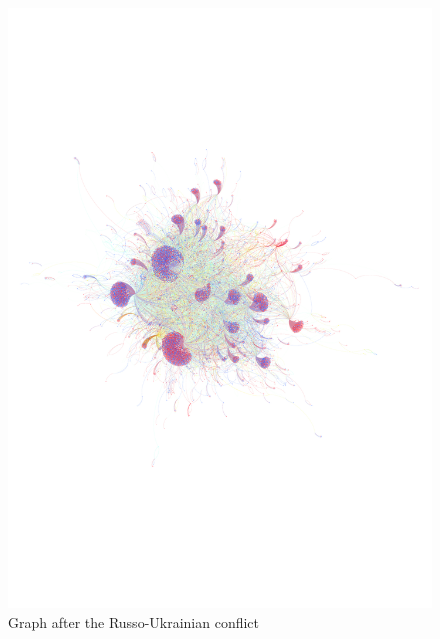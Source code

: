 \documentclass[sigchi]{acmart}
\begin{document}
\begin{figure}[h]
  \centering
  \includegraphics[width=0.98\columnwidth]{report/img/graph_after_sparso.pdf}
  \caption{Graph after the Russo-Ukrainian conflict}
  \label{fig:graphafter}
\end{figure}
\end{document}
